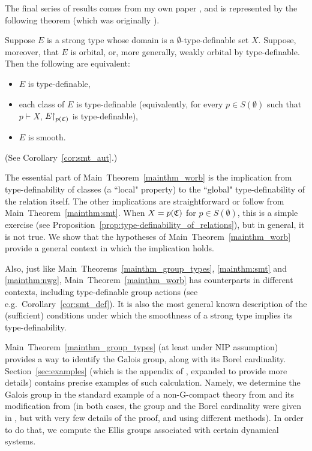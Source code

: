 	
	
	The final series of results comes from my own paper \cite{Rz16}, and is represented by the following theorem (which was originally \cite[Corollary 4.10]{Rz16}).
	\begin{mainthm}
		\label{mainthm_worb}
		Suppose $E$ is a strong type whose domain is a $\emptyset$-type-definable set $X$. Suppose, moreover, that $E$ is orbital, or, more generally, weakly orbital by type-definable. Then the following are equivalent:
		\begin{itemize}
			\item
			$E$ is type-definable,
			\item
			each class of $E$ is type-definable (equivalently, for every $p\in S(\emptyset)$ such that $p\vdash X$, $E\mathord{\upharpoonright}_{p({\mathfrak C})}$ is type-definable),
			\item
			$E$ is smooth.
		\end{itemize}
	\end{mainthm}
	(See Corollary~\ref{cor:smt_aut}.)
	
	The essential part of Main~Theorem~\ref{mainthm_worb} is the implication from type-definability of classes (a ``local" property) to the ``global" type-definability of the relation itself. The other implications are straightforward or follow from Main~Theorem~\ref{mainthm:smt}. When $X=p({\mathfrak C})$ for $p\in S(\emptyset)$, this is a simple exercise (see Proposition~\ref{prop:type-definability_of_relations}), but in general, it is not true. We show that the hypotheses of Main~Theorem~\ref{mainthm_worb} provide a general context in which the implication holds.
	
	Also, just like Main~Theorems~\ref{mainthm_group_types}, \ref{mainthm:smt} and \ref{mainthm:nwg}, Main~Theorem~\ref{mainthm_worb} has counterparts in different contexts, including type-definable group actions (see e.g.\ Corollary~\ref{cor:smt_def}). It is also the most general known description of the (sufficient) conditions under which the smoothness of a strong type implies its type-definability.
	
	Main~Theorem~\ref{mainthm_group_types} (at least under NIP assumption) provides a way to identify the Galois group, along with its Borel cardinality. Section~\ref{sec:examples} (which is the appendix of \cite{KR18}, expanded to provide more details) contains precise examples of such calculation. Namely, we determine the Galois group in the standard example of a non-G-compact theory from \cite{CLPZ01} and its modification from \cite{KPS13} (in both cases, the group and the Borel cardinality were given in \cite{KPS13}, but with very few details of the proof, and using different methods). In order to do that, we compute the Ellis groups associated with certain dynamical systems.
	

